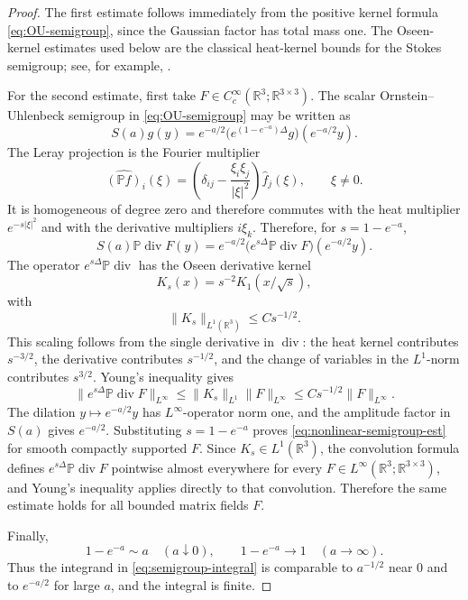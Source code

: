 \documentclass[11pt]{amsart}
\theoremstyle{plain}
\theoremstyle{definition}
\theoremstyle{remark}
\numberwithin{equation}{section}
\begin{document}
\begin{proof}
The first estimate follows immediately from the positive kernel formula
\eqref{eq:OU-semigroup}, since the Gaussian factor has total mass one.  The
Oseen-kernel estimates used below are the classical heat-kernel bounds for
the Stokes semigroup; see, for example, \cite{Sohr2001,Galdi2011}.

For the second estimate, first take \(F\in C_c^\infty(\mathbb R^3;\mathbb R^{3\times3})\).
The scalar Ornstein--Uhlenbeck semigroup in \eqref{eq:OU-semigroup} may be
written as
\[
   S(a)g(y)=e^{-a/2}\bigl(e^{(1-e^{-a})\Delta}g\bigr)(e^{-a/2}y).
\]
The Leray projection is the Fourier multiplier
\[
   \widehat{(\mathbb P f)}_i(\xi)
   =
   \left(\delta_{ij}-\frac{\xi_i\xi_j}{|\xi|^2}\right)\widehat f_j(\xi),
   \qquad \xi\ne0.
\]
It is homogeneous of degree zero and therefore commutes with the heat
multiplier \(e^{-s|\xi|^2}\) and with the derivative multipliers
\(i\xi_k\).  Therefore, for
\(s=1-e^{-a}\),
\[
   S(a)\mathbb P\operatorname{div}F(y)
   =
   e^{-a/2}
   \bigl(e^{s\Delta}\mathbb P\operatorname{div}F\bigr)(e^{-a/2}y).
\]
The operator \(e^{s\Delta}\mathbb P\operatorname{div}\) has the Oseen
derivative kernel
\[
   K_s(x)=s^{-2}K_1(x/\sqrt{s}),
\]
with
\[
   \|K_s\|_{L^1(\mathbb R^3)}\le C s^{-1/2}.
\]
This scaling follows from the single derivative in \(\operatorname{div}\):
the heat kernel contributes \(s^{-3/2}\), the derivative contributes
\(s^{-1/2}\), and the change of variables in the \(L^1\)-norm contributes
\(s^{3/2}\).  Young's inequality gives
\[
   \|e^{s\Delta}\mathbb P\operatorname{div}F\|_{L^\infty}
   \le \|K_s\|_{L^1}\|F\|_{L^\infty}
   \le Cs^{-1/2}\|F\|_{L^\infty}.
\]
The dilation \(y\mapsto e^{-a/2}y\) has \(L^\infty\)-operator norm one, and
the amplitude factor in \(S(a)\) gives \(e^{-a/2}\).  Substituting
\(s=1-e^{-a}\) proves \eqref{eq:nonlinear-semigroup-est} for smooth compactly
supported \(F\).  Since \(K_s\in L^1(\mathbb R^3)\), the convolution formula
defines \(e^{s\Delta}\mathbb P\operatorname{div}F\) pointwise almost
everywhere for every
\(F\in L^\infty(\mathbb R^3;\mathbb R^{3\times3})\), and Young's inequality
applies directly to that convolution.  Therefore the same estimate holds for
all bounded matrix fields \(F\).

Finally,
\[
   1-e^{-a}\sim a \quad (a\downarrow0),
   \qquad
   1-e^{-a}\to1 \quad (a\to\infty).
\]
Thus the integrand in \eqref{eq:semigroup-integral} is comparable to
\(a^{-1/2}\) near \(0\) and to \(e^{-a/2}\) for large \(a\), and the integral
is finite.
\end{proof}
\end{document}
